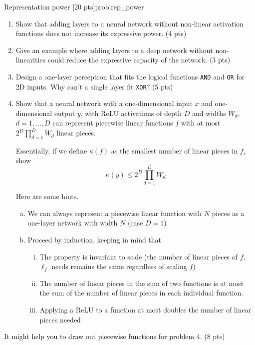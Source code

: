 \newpage{}
\begin{problem}{Representation power \hfill[20 pts]}{prob:rep_power}

\begin{enumerate}
\item Show that adding layers to a neural network without non-linear activation functions does not increase its expressive power. \hfill (4 pts)
\item Give an example where adding layers to a deep network without non-linearities could reduce the expressive capacity of the network. \hfill (3 pts)
\item Design a one-layer perceptron that fits the logical functions \texttt{AND} and \texttt{OR} for 2D inputs. Why can't a single layer fit \texttt{XOR}? \hfill (5 pts)

\item Show that a neural network with a one-dimensional input $x$ and one-dimensional output $y$, with ReLU activations of depth $D$ and widths $W_d$, $d=1,\dots,D$ can represent piecewise linear functions $f$ with at most $2^D \prod_{d=1}^{D} W_d$ linear pieces.

Essentially, if we define $\kappa(f)$ as the smallest number of linear pieces in $f$, show
\[
\kappa(y) \le 2^D \prod_{d=1}^{D} W_d
\]

Here are some hints.
    \begin{enumerate}[a.]
        \item We can always represent a piecewise linear function with $N$ pieces as a one-layer network with width $N$ (case $D=1$)
        \item Proceed by induction, keeping in mind that
        \begin{enumerate}[i.]
            \item The property is invariant to scale (the number of linear pieces of $f$, $\ell_f$ needs remains the same regardless of scaling $f$)
            \item The number of linear pieces in the sum of two functions is at most the sum of the number of linear pieces in each individual function.
            \item Applying a ReLU to a function at most doubles the number of linear pieces needed
        \end{enumerate}
    \end{enumerate}

\end{enumerate} 

It might help you to draw out piecewise functions for problem 4. \hfill (8 pts)
\end{problem}

